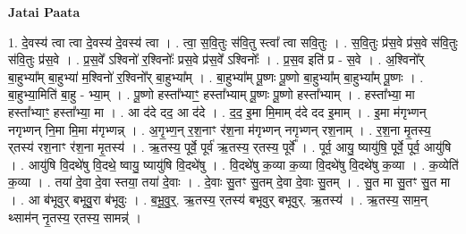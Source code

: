 \documentclass[17pt]{extarticle}
\begin{document}
\textbf{Jatai Paata} \newline

1. दे॒वस्य॑ त्वा त्वा दे॒वस्य॑ दे॒वस्य॑ त्वा । . त्वा॒ स॒वि॒तुः स॑वि॒तु स्त्वा᳚ त्वा सवि॒तुः । . स॒वि॒तुः प्र॑स॒वे प्र॑स॒वे स॑वि॒तुः स॑वि॒तुः प्र॑स॒वे । . प्र॒स॒वे᳚ ऽश्विनो॑ र॒श्विनोः᳚ प्रस॒वे प्र॑स॒वे᳚ ऽश्विनोः᳚ । . प्र॒स॒व इति॑ प्र - स॒वे । . अ॒श्विनो᳚र् बा॒हुभ्या᳚म् बा॒हुभ्या॑ म॒श्विनो॑ र॒श्विनो᳚र् बा॒हुभ्या᳚म् । . बा॒हुभ्या᳚म् पू॒ष्णः पू॒ष्णो बा॒हुभ्या᳚म् बा॒हुभ्या᳚म् पू॒ष्णः । . बा॒हुभ्या॒मिति॑ बा॒हु - भ्या॒म् । . पू॒ष्णो हस्ता᳚भ्याꣳ॒॒ हस्ता᳚भ्याम् पू॒ष्णः पू॒ष्णो हस्ता᳚भ्याम् । . हस्ता᳚भ्या॒ मा हस्ता᳚भ्याꣳ॒॒ हस्ता᳚भ्या॒ मा । . आ द॑दे दद॒ आ द॑दे । . द॒द॒ इ॒मा मि॒माम् द॑दे दद इ॒माम् । . इ॒मा म॑गृभ्णन् नगृभ्णन् नि॒मा मि॒मा म॑गृभ्णन्न् । . अ॒गृ॒भ्ण॒न् र॒श॒नाꣳ र॑श॒ना म॑गृभ्णन् नगृभ्णन् रश॒नाम् । . र॒श॒ना मृ॒तस्य॒ र्‌तस्य॑ रश॒नाꣳ र॑श॒ना मृ॒तस्य॑ । . ऋ॒तस्य॒ पूर्वे॒ पूर्व॑ ऋ॒तस्य॒ र्‌तस्य॒ पूर्वे᳚ । . पूर्व॒ आयु॒ ष्यायु॑षि॒ पूर्वे॒ पूर्व॒ आयु॑षि । . आयु॑षि वि॒दथे॑षु वि॒दथे॒ ष्वायु॒ ष्यायु॑षि वि॒दथे॑षु । . वि॒दथे॑षु क॒व्या क॒व्या वि॒दथे॑षु वि॒दथे॑षु क॒व्या । . क॒व्येति॑ क॒व्या । . तया॑ दे॒वा दे॒वा स्तया॒ तया॑ दे॒वाः । . दे॒वाः सु॒तꣳ सु॒तम् दे॒वा दे॒वाः सु॒तम् । . सु॒त मा सु॒तꣳ सु॒त मा । . आ ब॑भूवुर् बभूवु॒रा ब॑भूवुः । . ब॒भू॒वु॒र्॒. ऋ॒तस्य॒ र्‌तस्य॑ बभूवुर् बभूवुर्. ऋ॒तस्य॑ । . ऋ॒तस्य॒ साम॒न् थ्साम॑न् नृ॒तस्य॒ र्‌तस्य॒ सामन्न्॑ । \newline
\end{document}
